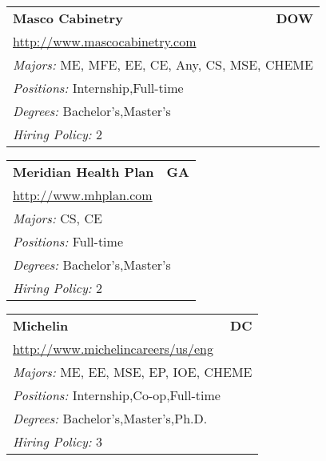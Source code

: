 \documentclass[twoside]{article}
\begin{document}
\begin{center}
\begin{multicols}{3}
\begin{FlushLeft}
\begin{minipage}{.9\columnwidth}
\end{minipage}
 
\begin{minipage}{.9\columnwidth}\begin{tabularx}{.95\columnwidth}{Xr}
                 {\Large\bf Masco Cabinetry} & {\Large\bf DOW}\\
    \multicolumn{2}{p{.95\columnwidth}}{\url{http://www.mascocabinetry.com}}\\
    \multicolumn{2}{p{.95\columnwidth}}{\emph{Majors:} ME, MFE, EE, CE, Any, CS, MSE, CHEME}\\
    \multicolumn{2}{p{.95\columnwidth}}{\emph{Positions:} Internship,Full-time}\\
    \multicolumn{2}{p{.95\columnwidth}}{\emph{Degrees:} Bachelor's,Master's}\\
    \multicolumn{2}{p{.95\columnwidth}}{\emph{Hiring Policy:} 2}\\
    \end{tabularx}
    
\end{minipage}
 
\begin{minipage}{.9\columnwidth}\begin{tabularx}{.95\columnwidth}{Xr}
                 {\Large\bf Meridian Health Plan} & {\Large\bf GA}\\
    \multicolumn{2}{p{.95\columnwidth}}{\url{http://www.mhplan.com}}\\
    \multicolumn{2}{p{.95\columnwidth}}{\emph{Majors:} CS, CE}\\
    \multicolumn{2}{p{.95\columnwidth}}{\emph{Positions:} Full-time}\\
    \multicolumn{2}{p{.95\columnwidth}}{\emph{Degrees:} Bachelor's,Master's}\\
    \multicolumn{2}{p{.95\columnwidth}}{\emph{Hiring Policy:} 2}\\
    \end{tabularx}
    
\end{minipage}
 
\begin{minipage}{.9\columnwidth}\begin{tabularx}{.95\columnwidth}{Xr}
                 {\Large\bf Michelin} & {\Large\bf DC}\\
    \multicolumn{2}{p{.95\columnwidth}}{\url{http://www.michelincareers/us/eng}}\\
    \multicolumn{2}{p{.95\columnwidth}}{\emph{Majors:} ME, EE, MSE, EP, IOE, CHEME}\\
    \multicolumn{2}{p{.95\columnwidth}}{\emph{Positions:} Internship,Co-op,Full-time}\\
    \multicolumn{2}{p{.95\columnwidth}}{\emph{Degrees:} Bachelor's,Master's,Ph.D.}\\
    \multicolumn{2}{p{.95\columnwidth}}{\emph{Hiring Policy:} 3}\\
    \end{tabularx}
    

\end{minipage}
\end{FlushLeft}
\end{multicols}
\end{center}
\end{document}
